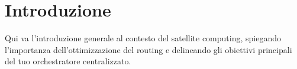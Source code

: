 \chapter{Introduzione}

Qui va l'introduzione generale al contesto del satellite computing, spiegando l'importanza dell'ottimizzazione del routing e delineando gli obiettivi principali del tuo orchestratore centralizzato.